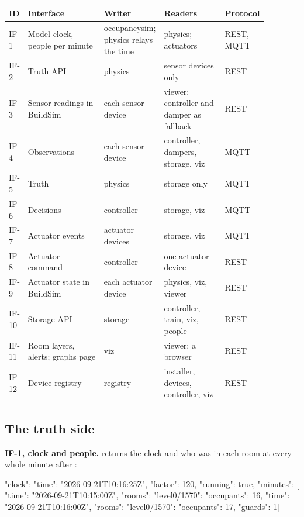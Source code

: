 \begin{longtable}[]{@{}L{0.06\linewidth}L{0.30\linewidth}L{0.19\linewidth}L{0.24\linewidth}L{0.09\linewidth}@{}}
\toprule
\textbf{ID} & \textbf{Interface} & \textbf{Writer} & \textbf{Readers} & \textbf{Protocol} \\
\midrule
\endhead
IF-1 & Model clock, people per minute & occupancysim; physics relays the time & physics; actuators & REST, MQTT \\
IF-2 & Truth API & physics & sensor devices only & REST \\
IF-3 & Sensor readings in BuildSim & each sensor device & viewer; controller and damper as fallback & REST \\
IF-4 & Observations  & each sensor device & controller, dampers, storage, viz & MQTT \\
IF-5 & Truth  & physics & storage only & MQTT \\
IF-6 & Decisions  & controller & storage, viz & MQTT \\
IF-7 & Actuator events  & actuator devices & storage, viz & MQTT \\
IF-8 & Actuator command & controller & one actuator device & REST \\
IF-9 & Actuator state in BuildSim & each actuator device & physics, viz, viewer & REST \\
IF-10 & Storage API & storage & controller, train, viz, people & REST \\
IF-11 & Room layers, alerts; graphs page & viz & viewer; a browser & REST \\
IF-12 & Device registry & registry & installer, devices, controller, viz & REST \\
\bottomrule
\end{longtable}

\subsection{The truth side}

\textbf{IF-1, clock and people.}
 returns the clock and who
was in each room at every whole minute after :

\begin{json}
{"clock": {"time": "2026-09-21T10:16:25Z", "factor": 120, "running": true},
 "minutes": [
  {"time": "2026-09-21T10:15:00Z", "rooms": {"level0/1570": {"occupants": 16}}},
  {"time": "2026-09-21T10:16:00Z", "rooms": {"level0/1570": {"occupants": 17, "guards": 1}}}]}
\end{json}

